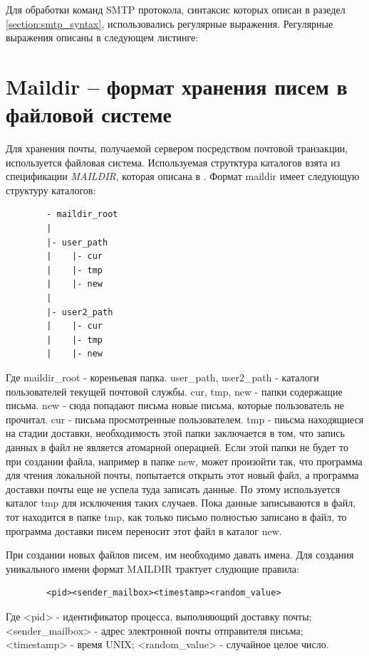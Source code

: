 \documentclass[a4paper,12pt]{report}
\begin{document}
    Для обработки команд SMTP протокола, синтаксис которых описан в разедел \ref{section:smtp_syntax}, использовались регулярные выражения. Регулярные выражения описаны в следующем листинге:
    
    
    \section{Maildir -- формат хранения писем в файловой системе}
    Для хранения почты, получаемой сервером посредством почтовой транзакции, используется файловая система. Используемая струтктура каталогов взята из спецификации \textit{MAILDIR}, которая описана в \cite{dovecot_maildir, qmail_maildir}. Формат maildir имеет следующую структуру каталогов:
    \begin{verbatim}
        - maildir_root
        |
        |- user_path
        |    |- cur
        |    |- tmp
        |    |- new
        |
        |- user2_path
        |    |- cur
        |    |- tmp
        |    |- new
    \end{verbatim}
    Где maildir\_root - кореньевая папка. user\_path, user2\_path - каталоги пользователей текущей почтовой службы. cur, tmp, new - папки содержащие письма. 
    new - сюда попадают письма новые письма, которые пользователь не прочитал. cur - письма просмотренные пользователем. tmp - пиьсма находящиеся на стадии доставки, необходимость этой папки заключается в том, что запись данных в файл не является атомарной операцией. Если этой папки не будет то при создании файла, например в папке new, может произойти так, что программа для чтения локальной почты, попытается открыть этот новый файл, а программа доставки почты еще не успела туда записать данные. По этому используется каталог tmp для исключения таких случаев. Пока данные записываются в файл, тот находится в папке tmp, как только письмо полностью записано в файл, то программа доставки писем переносит этот файл в каталог new.
    
    При создании новых файлов писем, им необходимо давать имена. Для создания уникального имени формат MAILDIR трактует слудющие правила:
    \begin{verbatim}
        <pid><sender_mailbox><timestamp><random_value>
    \end{verbatim}
    Где <pid> - идентификатор процесса, выполняющий доставку почты; <sender\_mailbox> - адрес электронной почты отправителя письма;  <timestamp> - время UNIX; <random\_value> - случайное целое число.
    
\end{document}
